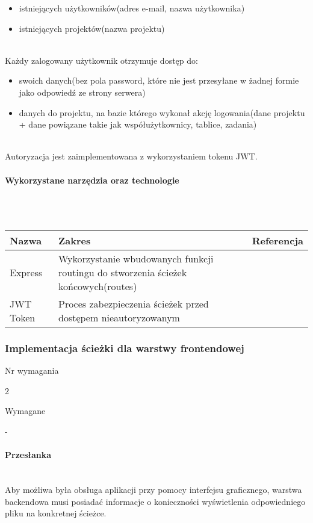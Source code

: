 \documentclass[eng,printmode]{mgr}
\begin{document}
\begin{itemize}
  \item [--] istniejących użytkowników(adres e-mail, nazwa użytkownika)
  \item[--] istniejących projektów(nazwa projektu)
\end{itemize}
\ \\
Każdy zalogowany użytkownik otrzymuje dostęp do:
\begin{itemize}
  \item[--] swoich danych(bez pola password, które nie jest przesyłane w żadnej formie jako odpowiedź ze strony serwera)
  \item[--] danych do projektu, na bazie którego wykonał akcję logowania(dane projektu + dane powiązane takie jak współużytkownicy, tablice, zadania)
\end{itemize}
\ \\
Autoryzacja jest zaimplementowana z wykorzystaniem tokenu JWT.


\paragraph{Wykorzystane narzędzia oraz technologie}\ \\ \\
\begin{tabularx}{\textwidth}{|l|X|l|}
  \hline
    \textbf{Nazwa} & \textbf{Zakres}  & \textbf{Referencja}\\
  \hline
    Express &
    Wykorzystanie wbudowanych funkcji routingu do stworzenia ścieżek końcowych(routes) &
    \cite{Express-routing}\\
  \hline
    JWT Token &
    Proces zabezpieczenia ścieżek przed dostępem nieautoryzowanym &
    \cite{JWT-route-secure} \\
  \hline
\end{tabularx}
\newpage

\subsubsection{Implementacja ścieżki dla warstwy frontendowej}
\begin{labeling}{Nr wymagania}
\item [Nr wymagania:] 2
\item [Typ:] Wymagane
\item [Powiązania:] -
\end{labeling}

\paragraph{Przesłanka}\ \\
Aby możliwa była obsługa aplikacji przy pomocy interfejsu graficznego, warstwa backendowa musi posiadać informacje o konieczności wyświetlenia odpowiedniego pliku na konkretnej ścieżce.
\end{document}
